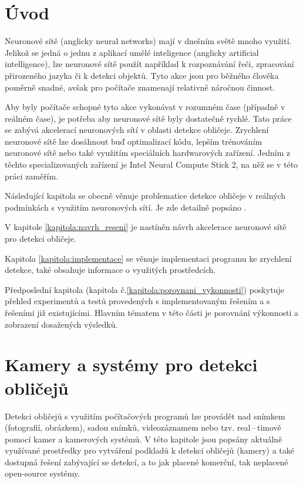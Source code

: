 \chapter{Úvod}
Neuronové sítě (anglicky neural networks) mají v dnešním světě mnoho využití. Jelikož se jedná o jednu z aplikací umělé inteligence (anglicky artificial intelligence), lze neuronové sítě použít například k rozpoznávání řeči, zpracování přirozeného jazyka či k detekci objektů.
Tyto akce jsou pro běžného člověka poměrně snadné, avšak pro počítače znamenají relativně náročnou činnost.

Aby byly počítače schopné tyto akce vykonávat v rozumném čase (případně v reálném čase), je potřeba aby neuronové sítě byly dostatečně rychlé. Tato práce se zabývá akcelerací neuronových sítí v oblasti detekce obličeje. Zrychlení neuronové sítě lze dosáhnout buď optimalizací kódu, lepším trénováním neuronové sítě nebo také využitím speciálních hardwarových zařízení. Jedním z těchto specializovaných zařízení je Intel Neural Compute Stick 2, na něž se v této práci zaměřím. 

Následující kapitola se obecně věnuje problematice detekce obličeje v reálných podmínkách s využitím neuronových sítí. Je zde detailně popsáno .

V kapitole \ref{kapitola:navrh_reseni} je nastíněn návrh akcelerace neuronové sítě pro detekci obličeje. \todo{\blindtext}

Kapitola \ref{kapitola:implementace} se věnuje implementaci programu ke zrychlení detekce, také obsahuje informace o využitých prostředcích.

Předposlední kapitola (kapitola č.\ref{kapitola:porovnani_vykonnosti}) poskytuje přehled experimentů a testů provedených s implementovaným řešením a s řešeními již existujícími. Hlavním tématem v této části je porovnání výkonnosti a zobrazení dosažených výsledků.

\nocite{*}

\chapter{Kamery a systémy pro detekci obličejů}
\label{kapitola:kamery_a_systemy}
Detekci obličejů s využitím počítačových programů lze provádět nad snímkem 
(fotografií, obrázkem), sadou snímků,
videozáznamem nebo tzv. real\,--\,timově pomocí kamer a kamerových systémů.
V této kapitole jsou popsány aktuálně využívané prostředky pro vytváření 
podkladů k detekci obličejů (kamery) a také dostupná řešení zabývající se 
detekcí, a to jak placené komerční, tak neplacené open-source systémy.

